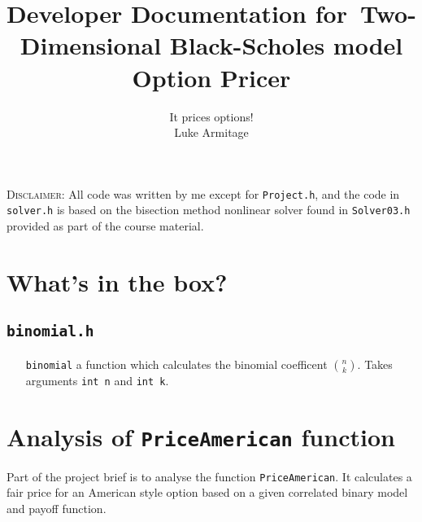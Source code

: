 \documentclass[12pt,a4paper]{article}
\author{It prices options! \\ Luke Armitage}\date{}
\title{{\bfseries Developer Documentation} for~Two-Dimensional Black-Scholes model Option Pricer}
\begin{document}
\maketitle

\textsc{Disclaimer}: All code was written by me except for \texttt{Project.h}, and the code in \texttt{solver.h} is based on the bisection method nonlinear solver found in \texttt{Solver03.h} provided as part of the course material.

\section{What's in the box?}
\subsection{\texttt{binomial.h}}
\begin{itemize}
	\item[\texttt{binomial}] a function which calculates the binomial coefficent $n\choose k$. Takes arguments \texttt{int n} and \texttt{int k}.
\end{itemize}

\section{Analysis of \texttt{PriceAmerican} function}
Part of the project brief is to analyse the function \texttt{PriceAmerican}. 
It calculates a fair price for an American style option based on a given correlated binary model and payoff function.
\end{document}
